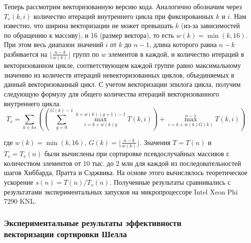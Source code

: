 Теперь рассмотрим векторизованную версию кода. 
Аналогично обозначим через $T_v(k,i)$ количество итераций внутреннего цикла при фиксированных $k$ и $i$. 
Нам известно, что ширина векторизации не может превышать $k$ (из-за зависимостей по обращению к массиву), и 16 (размер вектора), то есть $w(k) = \min(k, 16)$. 
При этом весь диапазон значений $i$ от $k$ до $n - 1$, длина которого равна $n - k$ разбивается на $\lfloor \frac{n - k}{w(k)} \rfloor$ групп по $w$ элементов в каждой, и количество итераций в векторизованном цикле, соответствующем каждой группе равно максимальному значению из количеств итераций невекторизованных циклов, объединяемых в данный векторизованный цикл. 
С учетом векторизации эпилога цикла\label{term:epilog2}, получим следующую формулу для общего количества итераций векторизованного внутреннего цикла.
\begin{equation}
	T_v = \sum_{k \in ks}
	{
		\left(
			\left(
				\sum_{g = 0}^{G(k) - 1}{\max_{i = k + w(k)g}^{k + w(k)(g + 1) - 1}{T(k, i)}}
			\right)
			+ \max_{i = k + w(k)G(k)}^{n - 1}{T(k, i)}
		\right)
	}
\end{equation}

где $w(k) = \min(k, 16)$, $G(k) = \lfloor \frac{n - k}{w(k)} \rfloor$. 
Значения $T = T(n)$ и $T_v = T_v(n)$ были вычислены при сортировке псевдослучайных массивов с количеством элементов от 10 тыс. до 2 млн для каждой из последовательностей шагов Хиббарда, Пратта и Сэджвика. 
На основе этого вычислялось теоретическое ускорение $s(n) = T(n)/T_v(n)$.
Полученные результаты сравнивались с результатами экспериментальных запусков на микропроцессоре Intel Xeon Phi 7290 KNL\label{abbr:knl14}.

\subsubsection{Экспериментальные результаты эффективности \\ векторизации сортировки Шелла}

